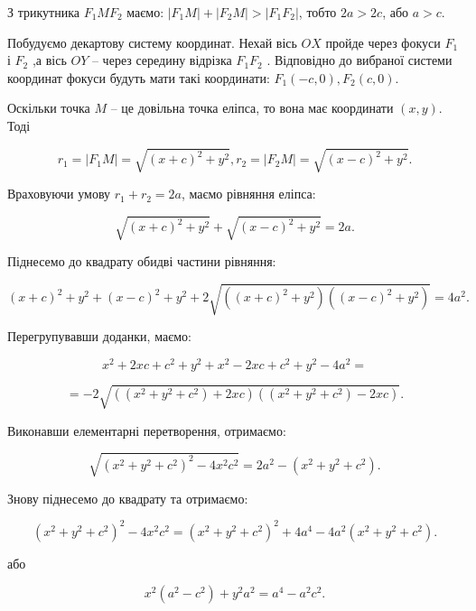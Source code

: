 З трикутника $F_1MF_2$ маємо: $|F_1M| + |F_2M| > |F_1F_2|$, тобто $2a > 2c$, або $a>c$.

\noindent\parbox{6cm}{}
\parbox{\textwidth - 6.1cm}{
	Побудуємо декартову систему
	координат. Нехай вісь $OX$
	пройде через фокуси $F_1$ і $F_2$ ,а
	вісь $OY$ -- через середину
	відрізка $F_1F_2$ . Відповідно до
	вибраної системи координат
	фокуси будуть мати такі
	координати: $F_1(-c,0), F_2(c,0)$. 
}

Оскільки точка $M$ -- це довільна точка еліпса, то вона має координати $(x,y)$. Тоді

$$r_1 = |F_1M| = \sqrt{(x+c)^2+y^2}, r_2 = |F_2M| = \sqrt{(x-c)^2+y^2}.$$

Враховуючи умову $r_1 + r_2 = 2a$, маємо рівняння еліпса:

$$\sqrt{(x+c)^2+y^2} + \sqrt{(x-c)^2+y^2} = 2a.$$

Піднесемо до квадрату обидві частини рівняння:

$$(x+c)^2+y^2 + (x-c)^2+y^2 + 2\sqrt{((x+c)^2+y^2)((x-c)^2+y^2)} = 4a^2.$$

Перегрупувавши доданки, маємо:

$$x^2 + 2xc + c^2 + y^2 + x^2 - 2xc + c^2 + y^2 - 4a^2 = $$

$$= -2\sqrt{((x^2 + y^2 + c^2) + 2xc)((x^2 + y^2 + c^2) - 2xc)}.$$

Виконавши елементарні перетворення, отримаємо: 

$$\sqrt{(x^2 + y^2 + c^2)^2 - 4x^2c^2} = 2a^2 - (x^2 + y^2 + c^2).$$

Знову піднесемо до квадрату та отримаємо:

$$(x^2 + y^2 + c^2)^2 - 4x^2c^2 = (x^2 + y^2 + c^2)^2 + 4a^4 - 4a^2(x^2 + y^2 + c^2).$$

\begin{center}
	або
\end{center}	
	
$$x^2(a^2 - c^2) + y^2a^2 = a^4 - a^2c^2.$$


